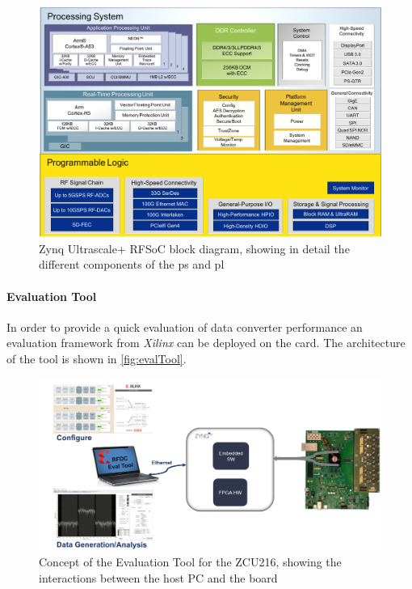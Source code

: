 \begin{figure}[H]
	\centering
	\includegraphics[width = \textwidth]{chap/05-readout/img/rfsoc_blockdiagram}
	\caption[Zynq Ultrascale+ RFSoC block diagram]{Zynq Ultrascale+ RFSoC block diagram, showing in detail the different components of the \gls{ps} and \gls{pl}}
	\label{fig:rfsoc}
\end{figure}

\clearpage
\paragraph{Evaluation Tool}
In order to provide a quick evaluation of data converter performance an evaluation framework from \textit{Xilinx} can be deployed on the card. 
The architecture of the tool is shown in \autoref{fig:evalTool}. \cite{zcu216evaltool}

\begin{figure}[H]
	\centering
	\includegraphics[width = \textwidth]{chap/05-readout/img/zcu216evaltool}
	\caption[ZCU216 Evaluation Tool]{Concept of the Evaluation Tool for the ZCU216, showing the interactions between the host PC and the board \cite{zcu216evaltool}}
	\label{fig:evalTool}
\end{figure}

